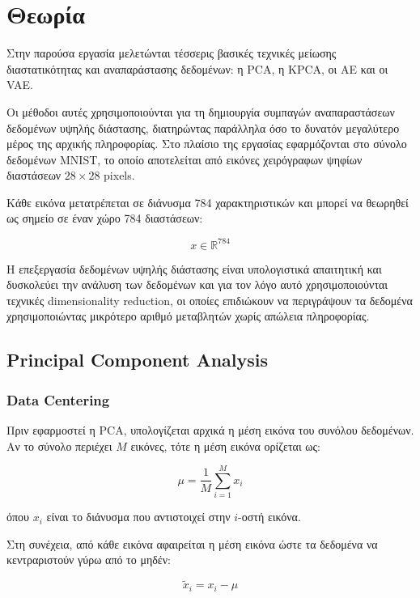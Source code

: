 \documentclass[12pt]{article}
\begin{document}
\section{Θεωρία}
Στην παρούσα εργασία μελετώνται τέσσερις βασικές τεχνικές μείωσης διαστατικότητας και αναπαράστασης δεδομένων: η PCA, η KPCA, οι AE και οι VAE.

Οι μέθοδοι αυτές χρησιμοποιούνται για τη δημιουργία συμπαγών αναπαραστάσεων δεδομένων υψηλής διάστασης, διατηρώντας παράλληλα όσο το δυνατόν μεγαλύτερο 
μέρος της αρχικής πληροφορίας. Στο πλαίσιο της εργασίας εφαρμόζονται στο σύνολο δεδομένων MNIST, το οποίο αποτελείται από εικόνες χειρόγραφων ψηφίων 
διαστάσεων \(28 \times 28\) pixels.

Κάθε εικόνα μετατρέπεται σε διάνυσμα 784 χαρακτηριστικών και μπορεί να θεωρηθεί ως σημείο σε έναν χώρο 784 διαστάσεων:

\begin{equation}
x \in \mathbb{R}^{784}
\end{equation}

Η επεξεργασία δεδομένων υψηλής διάστασης είναι υπολογιστικά απαιτητική και δυσκολεύει την ανάλυση των δεδομένων και για τον λόγο αυτό 
χρησιμοποιούνται τεχνικές dimensionality reduction, οι οποίες επιδιώκουν να περιγράψουν τα δεδομένα χρησιμοποιώντας μικρότερο αριθμό μεταβλητών 
χωρίς απώλεια πληροφορίας.

\subsection{Principal Component Analysis}

\subsubsection{Data Centering}
Πριν εφαρμοστεί η PCA, υπολογίζεται αρχικά η μέση εικόνα του συνόλου δεδομένων. Αν το σύνολο περιέχει $M$ εικόνες, τότε η μέση εικόνα ορίζεται ως:

\begin{equation}
\mu = \frac{1}{M}\sum_{i=1}^{M} x_i
\end{equation}

όπου $x_i$ είναι το διάνυσμα που αντιστοιχεί στην $i$-οστή εικόνα.

Στη συνέχεια, από κάθε εικόνα αφαιρείται η μέση εικόνα ώστε τα δεδομένα να κεντραριστούν γύρω από το μηδέν:

\begin{equation}
\tilde{x}_i = x_i - \mu
\end{equation}
\end{document}
